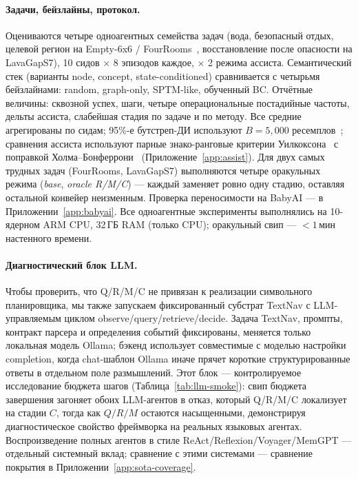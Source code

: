 \documentclass{article}
\begin{document}
\paragraph{Задачи, бейзлайны, протокол.}
Оцениваются четыре одноагентных семейства задач (вода, безопасный отдых, целевой регион на Empty-6x6 / FourRooms~\citep{sutton1999between}, восстановление после опасности на LavaGapS7), 10 сидов $\times$ 8 эпизодов каждое, $\times$ 2 режима ассиста. Семантический стек (варианты node, concept, state-conditioned) сравнивается с четырьмя бейзлайнами: random, graph-only, SPTM-like, обученный BC. Отчётные величины: сквозной успех, шаги, четыре операциональные постадийные частоты, дельты ассиста, слабейшая стадия по задаче и по методу. Все средние агрегированы по сидам; 95\%-е бутстреп-ДИ используют $B{=}5{,}000$ ресемплов~\citep{efron1979bootstrap}; сравнения ассиста используют парные знако-ранговые критерии Уилкоксона~\citep{wilcoxon1945individual} с поправкой Холма--Бонферрони~\citep{holm1979simple} (Приложение~\ref{app:assist}). Для двух самых трудных задач (FourRooms, LavaGapS7) выполняются четыре оракульных режима (\emph{base}, \emph{oracle R/M/C}) --- каждый заменяет ровно одну стадию, оставляя остальной конвейер неизменным. Проверка переносимости на BabyAI --- в Приложении~\ref{app:babyai}. Все одноагентные эксперименты выполнялись на 10-ядерном ARM CPU, 32\,ГБ RAM (только CPU); оракульный свип --- $<1$\,мин настенного времени.

\paragraph{Диагностический блок LLM.}
Чтобы проверить, что Q/R/M/C не привязан к реализации символьного планировщика, мы также запускаем фиксированный субстрат TextNav с LLM-управляемым циклом observe/query/retrieve/decide. Задача TextNav, промпты, контракт парсера и определения событий фиксированы, меняется только локальная модель Ollama; бэкенд использует совместимые с моделью настройки completion, когда chat-шаблон Ollama иначе прячет короткие структурированные ответы в отдельном поле размышлений. Этот блок --- контролируемое исследование бюджета шагов (Таблица~\ref{tab:llm-smoke}): свип бюджета завершения загоняет обоих LLM-агентов в отказ, который Q/R/M/C локализует на стадии $C$, тогда как $Q/R/M$ остаются насыщенными, демонстрируя диагностическое свойство фреймворка на реальных языковых агентах. Воспроизведение полных агентов в стиле ReAct/Reflexion/Voyager/MemGPT --- отдельный системный вклад; сравнение с этими системами --- сравнение покрытия в Приложении~\ref{app:sota-coverage}.
\end{document}

